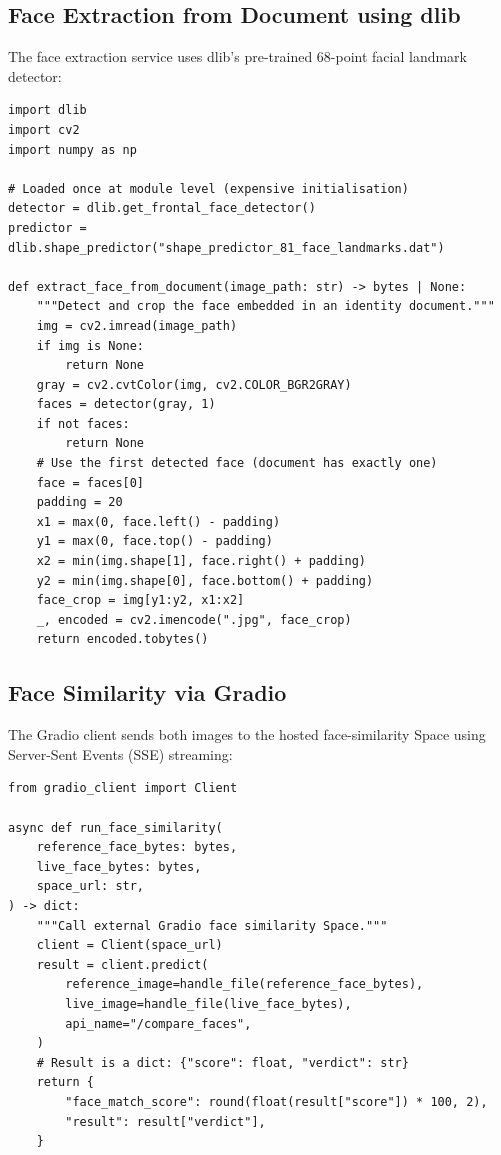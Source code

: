 \subsection{Face Extraction from Document using dlib}

The face extraction service uses dlib's pre-trained 68-point facial landmark detector:

\begin{lstlisting}[style=pythonstyle, caption=Face Extraction using dlib]
import dlib
import cv2
import numpy as np

# Loaded once at module level (expensive initialisation)
detector = dlib.get_frontal_face_detector()
predictor = dlib.shape_predictor("shape_predictor_81_face_landmarks.dat")

def extract_face_from_document(image_path: str) -> bytes | None:
    """Detect and crop the face embedded in an identity document."""
    img = cv2.imread(image_path)
    if img is None:
        return None
    gray = cv2.cvtColor(img, cv2.COLOR_BGR2GRAY)
    faces = detector(gray, 1)
    if not faces:
        return None
    # Use the first detected face (document has exactly one)
    face = faces[0]
    padding = 20
    x1 = max(0, face.left() - padding)
    y1 = max(0, face.top() - padding)
    x2 = min(img.shape[1], face.right() + padding)
    y2 = min(img.shape[0], face.bottom() + padding)
    face_crop = img[y1:y2, x1:x2]
    _, encoded = cv2.imencode(".jpg", face_crop)
    return encoded.tobytes()
\end{lstlisting}

\subsection{Face Similarity via Gradio}

The Gradio client sends both images to the hosted face-similarity Space using Server-Sent Events (SSE) streaming:

\begin{lstlisting}[style=pythonstyle, caption=Gradio Face Similarity Client (simplified)]
from gradio_client import Client

async def run_face_similarity(
    reference_face_bytes: bytes,
    live_face_bytes: bytes,
    space_url: str,
) -> dict:
    """Call external Gradio face similarity Space."""
    client = Client(space_url)
    result = client.predict(
        reference_image=handle_file(reference_face_bytes),
        live_image=handle_file(live_face_bytes),
        api_name="/compare_faces",
    )
    # Result is a dict: {"score": float, "verdict": str}
    return {
        "face_match_score": round(float(result["score"]) * 100, 2),
        "result": result["verdict"],
    }
\end{lstlisting}

